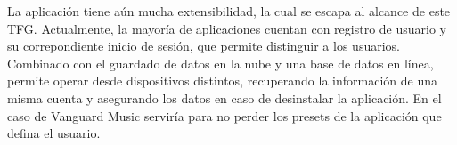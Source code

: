La aplicación tiene aún mucha extensibilidad, la cual se escapa al alcance de este TFG. Actualmente, la mayoría de aplicaciones cuentan con registro de usuario y su correpondiente inicio de sesión, que permite distinguir a los usuarios. Combinado con el guardado de datos en la nube y una base de datos en línea, permite operar desde dispositivos distintos, recuperando la información de una misma cuenta y asegurando los datos en caso de desinstalar la aplicación. En el caso de Vanguard Music serviría para no perder los presets de la aplicación que defina el usuario.



